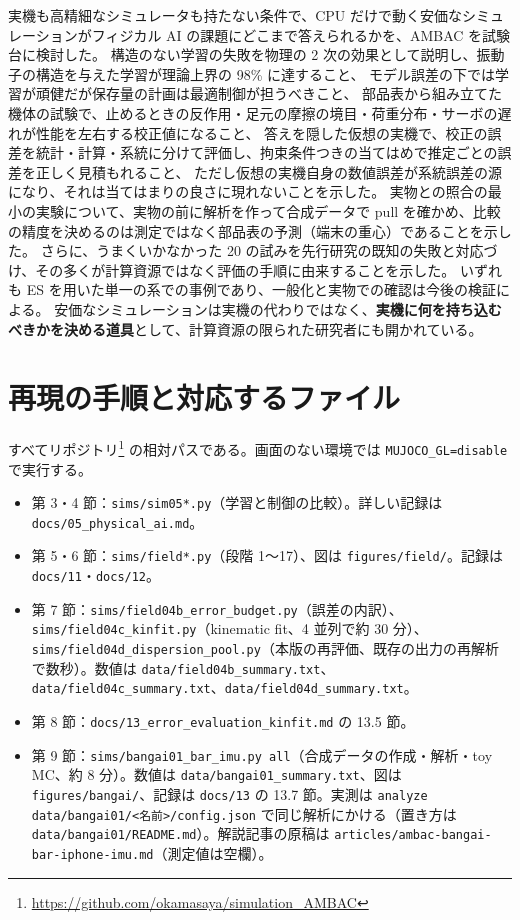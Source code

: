 \documentclass[paper=a4paper,fontsize=10pt,twocolumn,column_gap=2zw,line_length=24zw,number_of_lines=46,head_space=20mm]{jlreq}
\newcommand{\repo}{https://github.com/okamasaya/simulation_AMBAC}
\begin{document}
実機も高精細なシミュレータも持たない条件で、CPU だけで動く安価なシミュレーションがフィジカル AI の課題にどこまで答えられるかを、AMBAC を試験台に検討した。
構造のない学習の失敗を物理の 2 次の効果として説明し、振動子の構造を与えた学習が理論上界の 98\% に達すること、
モデル誤差の下では学習が頑健だが保存量の計画は最適制御が担うべきこと、
部品表から組み立てた機体の試験で、止めるときの反作用・足元の摩擦の境目・荷重分布・サーボの遅れが性能を左右する校正値になること、
答えを隠した仮想の実機で、校正の誤差を統計・計算・系統に分けて評価し、拘束条件つきの当てはめで推定ごとの誤差を正しく見積もれること、
ただし仮想の実機自身の数値誤差が系統誤差の源になり、それは当てはまりの良さに現れないことを示した。
実物との照合の最小の実験について、実物の前に解析を作って合成データで pull を確かめ、比較の精度を決めるのは測定ではなく部品表の予測（端末の重心）であることを示した。
さらに、うまくいかなかった 20 の試みを先行研究の既知の失敗と対応づけ、その多くが計算資源ではなく評価の手順に由来することを示した。
いずれも ES を用いた単一の系での事例であり、一般化と実物での確認は今後の検証による。
安価なシミュレーションは実機の代わりではなく、\textbf{実機に何を持ち込むべきかを決める道具}として、計算資源の限られた研究者にも開かれている。

\appendix
\section{再現の手順と対応するファイル}
\small
すべてリポジトリ\footnote{\url{\repo}} の相対パスである。画面のない環境では \texttt{MUJOCO\_GL=disable} で実行する。
\begin{itemize}\setlength{\itemsep}{0pt}
\item 第 3・4 節：\texttt{sims/sim05*.py}（学習と制御の比較）。詳しい記録は \texttt{docs/05\_physical\_ai.md}。
\item 第 5・6 節：\texttt{sims/field*.py}（段階 1〜17）、図は \texttt{figures/field/}。記録は \texttt{docs/11}・\texttt{docs/12}。
\item 第 7 節：\texttt{sims/field04b\_error\_budget.py}（誤差の内訳）、\texttt{sims/field04c\_kinfit.py}（kinematic fit、4 並列で約 30 分）、
\texttt{sims/field04d\_dispersion\_pool.py}（本版の再評価、既存の出力の再解析で数秒）。数値は \texttt{data/field04b\_summary.txt}、\texttt{data/field04c\_summary.txt}、\texttt{data/field04d\_summary.txt}。
\item 第 8 節：\texttt{docs/13\_error\_evaluation\_kinfit.md} の 13.5 節。
\item 第 9 節：\texttt{sims/bangai01\_bar\_imu.py all}（合成データの作成・解析・toy MC、約 8 分）。数値は \texttt{data/bangai01\_summary.txt}、図は \texttt{figures/bangai/}、記録は \texttt{docs/13} の 13.7 節。実測は \texttt{analyze data/bangai01/<名前>/config.json} で同じ解析にかける（置き方は \texttt{data/bangai01/README.md}）。解説記事の原稿は \texttt{articles/ambac-bangai-bar-iphone-imu.md}（測定値は空欄）。
\end{itemize}
\end{document}
